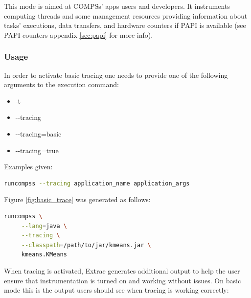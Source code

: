 This mode is aimed at COMPSs' apps users and developers. It instruments computing threads and some management resources providing information about tasks' executions, 
data transfers, and hardware counters if PAPI is available (see PAPI counters appendix \ref{sec:papi} for more info). 

\subsubsection{Usage}

In order to activate basic tracing one needs to provide one of the following arguments to the execution command:

\begin{itemize}
 \item -t
 \item -{}-tracing
 \item -{}-tracing=basic
 \item -{}-tracing=true
\end{itemize}


\noindent Examples given:

\begin{lstlisting}[language=bash]
runcompss --tracing application_name application_args
\end{lstlisting}

\noindent Figure \ref{fig:basic_trace} was generated as follows:


\begin{lstlisting}[language=bash]
runcompss \
     --lang=java \
     --tracing \
     --classpath=/path/to/jar/kmeans.jar \
     kmeans.KMeans
\end{lstlisting}

When tracing is activated, Extrae generates additional output to help the user ensure that instrumentation is turned on and working without issues. On basic mode this is the output users should see when tracing is working correctly:


